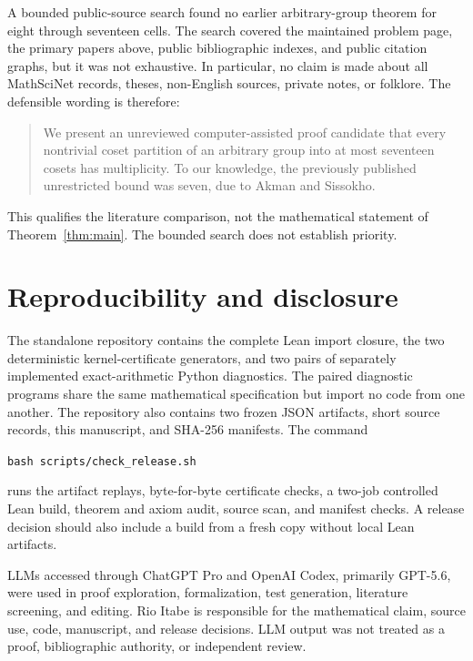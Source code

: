 \documentclass[11pt]{article}
\theoremstyle{definition}
\begin{document}
A bounded public-source search found no earlier arbitrary-group theorem for
eight through seventeen cells. The search covered the maintained problem page,
the primary papers above, public bibliographic indexes, and public citation
graphs, but it was not exhaustive. In particular, no claim is made about all
MathSciNet records, theses, non-English sources, private notes, or folklore.
The defensible wording is therefore:

\begin{quote}
We present an unreviewed computer-assisted proof candidate that every
nontrivial coset partition of an arbitrary group into at most seventeen
cosets has multiplicity. To our knowledge, the previously published
unrestricted bound was seven, due to Akman and Sissokho.
\end{quote}

This qualifies the literature comparison, not the mathematical statement of
Theorem~\ref{thm:main}. The bounded search does not establish priority.

\section{Reproducibility and disclosure}

The standalone repository contains the complete Lean import closure, the two
deterministic kernel-certificate generators, and two pairs of separately
implemented exact-arithmetic Python diagnostics. The paired diagnostic
programs share the same mathematical specification but import no code from
one another. The repository also contains two frozen JSON artifacts, short
source records, this manuscript, and SHA-256 manifests. The command
\begin{center}
\texttt{bash scripts/check\_release.sh}
\end{center}
runs the artifact replays, byte-for-byte certificate checks, a two-job
controlled Lean build, theorem and axiom audit, source scan, and manifest
checks. A release decision should also include a build from a fresh copy
without local Lean artifacts.

LLMs accessed through ChatGPT Pro and OpenAI Codex, primarily GPT-5.6, were
used in proof exploration, formalization, test generation, literature
screening, and editing. Rio Itabe is responsible for the mathematical claim,
source use, code, manuscript, and release decisions. LLM output was not
treated as a proof, bibliographic authority, or independent review.
\end{document}
